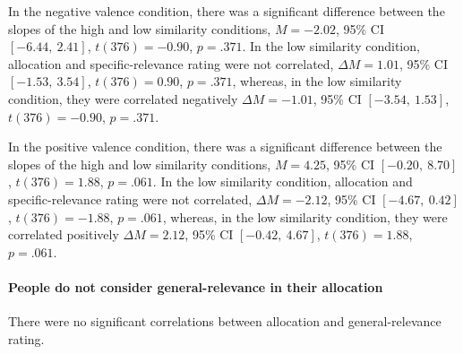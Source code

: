 \documentclass[a4paper, nobind, dvipsnames]{templates/ociamthesis}
\newcommand*{\bibtitle}{References}
\theoremstyle{definition}
\theoremstyle{definition}
\theoremstyle{definition}
\theoremstyle{definition}
\theoremstyle{remark}
\begin{document}
In the negative valence condition, there was a significant difference between
the slopes of the high and low similarity conditions,
\(M = -2.02\), 95\% CI \([-6.44,~2.41]\), \(t(376) = -0.90\), \(p = .371\).
In the low similarity condition, allocation and specific-relevance rating were
not correlated,
\(\Delta M = 1.01\), 95\% CI \([-1.53,~3.54]\), \(t(376) = 0.90\), \(p = .371\),
whereas, in the low similarity condition, they were correlated negatively
\(\Delta M = -1.01\), 95\% CI \([-3.54,~1.53]\), \(t(376) = -0.90\), \(p = .371\).

In the positive valence condition, there was a significant difference between
the slopes of the high and low similarity conditions,
\(M = 4.25\), 95\% CI \([-0.20,~8.70]\), \(t(376) = 1.88\), \(p = .061\).
In the low similarity condition, allocation and specific-relevance rating were
not correlated,
\(\Delta M = -2.12\), 95\% CI \([-4.67,~0.42]\), \(t(376) = -1.88\), \(p = .061\),
whereas, in the low similarity condition, they were correlated positively
\(\Delta M = 2.12\), 95\% CI \([-0.42,~4.67]\), \(t(376) = 1.88\), \(p = .061\).

\hypertarget{people-do-not-consider-general-relevance-in-their-allocation}{%
\paragraph{People do not consider general-relevance in their allocation}\label{people-do-not-consider-general-relevance-in-their-allocation}}

There were no significant correlations between allocation and general-relevance
rating.




\setlength{\baselineskip}{0pt} %

{\renewcommand*\MakeUppercase[1]{#1}%
\printbibliography[heading=bibintoc,title={\bibtitle}]}
\end{document}
